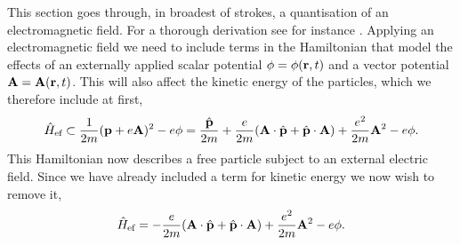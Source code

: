     This section goes through, in broadest of strokes, a quantisation of an electromagnetic 
    field. For a thorough derivation see for instance 
    \citeauthor{joachain2012atoms}\citeauthor{joachain2012atoms}.
    Applying an electromagnetic field we need to include terms in the Hamiltonian that 
    model the effects of an externally applied scalar potential $\phi = \phi(\vb{r}, t)$
    and a vector potential $\vb{A} = \vb{A}(\vb{r}, t)$. This will also affect the 
    kinetic energy of the particles, which we therefore include at first,
    \begin{equation}
        \hat{H}_\text{ef} 
            \subset \frac{1}{2m}(\vb{p} + e \vb{A})^2 - e\phi
            = \frac{\hat{\vb{p}}}{2m} + \frac{e}{2m}(\vb{A}\cdot\hat{\vb{p}} + \hat{\vb{p}}\cdot\vb{A})
                + \frac{e^2}{2m}\vb{A}^2 - e\phi.
    \end{equation}
    This Hamiltonian now describes a free particle subject to an external 
    electric field. Since we have already included a term for kinetic energy we 
    now wish to remove it,
    \begin{equation}
        \hat{H}_\text{ef} 
            = - \frac{e}{2m}(\vb{A}\cdot\hat{\vb{p}} + \hat{\vb{p}}\cdot\vb{A})
                + \frac{e^2}{2m}\vb{A}^2 - e\phi.
    \end{equation}

